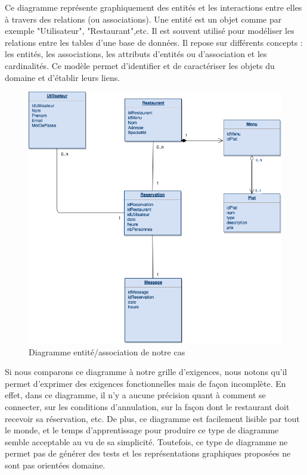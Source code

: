         Ce diagramme représente graphiquement des entités et les interactions entre elles à travers des relations (ou associations). Une entité est un objet comme par exemple "Utilisateur", "Restaurant",etc. Il est souvent utilisé pour modéliser les relations entre les tables d'une base de données. Il repose sur différents concepts : les entités, les associations, les attributs d'entités ou d'association et les cardinalités. Ce modèle permet d'identifier et de caractériser les objets du domaine et d'établir leurs liens.
        \begin{figure}[H]
            \centering
            \includegraphics[width=\textwidth]{images/er1.png}
            \caption{Diagramme entité/association de notre cas}
        \end{figure}
        Si nous comparons ce diagramme à notre grille d'exigences, nous notons qu'il permet d'exprimer des exigences fonctionnelles mais de façon incomplète. En effet, dans ce diagramme, il n'y a aucune précision quant à comment se connecter, sur les conditions d'annulation, sur la façon dont le restaurant doit recevoir sa réservation, etc. De plus, ce diagramme est facilement lisible par tout le monde, et le temps d'apprentissage pour produire ce type de diagramme semble acceptable au vu de sa simplicité. Toutefois, ce type de diagramme ne permet pas de générer des tests et les représentations graphiques proposées ne sont pas orientées domaine. 

